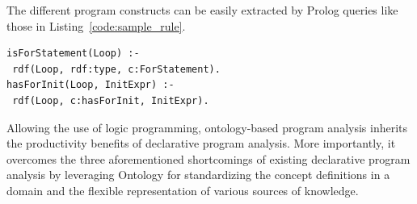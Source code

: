 The different program constructs can be easily extracted by Prolog queries like those in Listing~\ref{code:sample_rule}.
\begin{lstlisting}[xleftmargin=.1\columnwidth,
xrightmargin=.1\columnwidth, float,
caption= Sample analysis rules, label=code:sample_rule]
isForStatement(Loop) :-
 rdf(Loop, rdf:type, c:ForStatement).
hasForInit(Loop, InitExpr) :-
 rdf(Loop, c:hasForInit, InitExpr).
\end{lstlisting}


Allowing the use of logic programming, ontology-based program analysis
inherits the productivity benefits of declarative program
analysis. More importantly, it overcomes the three aforementioned
shortcomings of existing declarative program analysis by leveraging
Ontology for standardizing the concept definitions in a domain and the
flexible representation of various sources of knowledge. 




